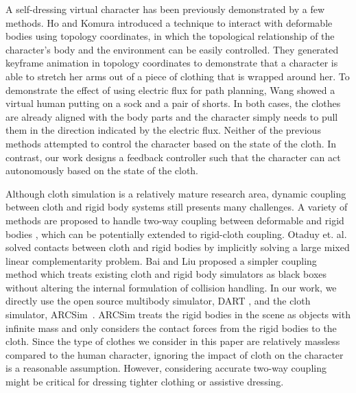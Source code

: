 A self-dressing virtual character has been previously demonstrated by a
few methods. Ho and Komura  introduced a technique
to interact with deformable bodies using topology coordinates, in which
the topological relationship of the character's body and the environment
can be easily controlled. They generated keyframe animation in topology
coordinates to demonstrate that a character is able to stretch her arms
out of a piece of clothing that is wrapped around her. To demonstrate the
effect of using electric flux for path planning, Wang \etal
{} showed a virtual human putting on a sock and a
pair of shorts. In both cases, the clothes are already aligned with the
body parts and the character simply needs to pull them in the direction
indicated by the electric flux. Neither of the previous methods attempted
to control the character based on the state of the cloth. In contrast, our
work designs a feedback controller such that the character can act
autonomously based on the state of the cloth. 


Although cloth simulation is a relatively mature research area, dynamic
coupling between cloth and rigid body systems still presents many
challenges. A variety of methods are proposed to handle two-way coupling
between deformable and rigid bodies
\cite{Jansson:2003:CDR,Sifakis:2007:HSD,Shinar:2008:TCR,Otaduy:2009:ICH,Miguel:2011:ESC},
which can be potentially extended to rigid-cloth coupling. Otaduy et. al.
\cite{Otaduy:2009:ICH} solved contacts between cloth and rigid bodies by
implicitly solving a large mixed linear complementarity problem. Bai and
Liu \cite{Bai:2014:CCR} proposed a simpler coupling method which treats
existing cloth and rigid body simulators as black boxes without altering
the internal formulation of collision handling. In our work, we directly
use the open source multibody simulator, DART \cite{Liu:2012:STM}, and the
cloth simulator, ARCSim~\cite{Narain:2012:AAR,Narain:2013:FCA}. ARCSim
treats the rigid bodies in the scene as objects with infinite mass and
only considers the contact forces from the rigid bodies to the cloth.
Since the type of clothes we consider in this paper are relatively
massless compared to the human character, ignoring the impact of cloth on
the character is a reasonable assumption. However, considering accurate
two-way coupling might be critical for dressing tighter clothing or
assistive dressing.

